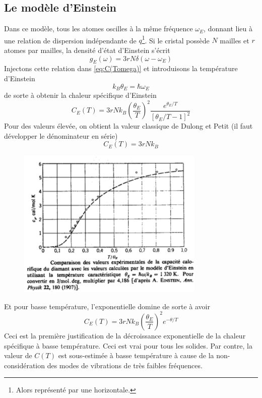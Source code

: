 	\subsection{Le modèle d'Einstein}
	Dans ce modèle, tous les atomes oscilles à la même fréquence $\omega_E$, 
	donnant lieu à une relation de dispersion indépendante de $q$\footnote{
	Alors représenté par une horizontale.}. Si le cristal possède $N$ mailles 
	et $r$ atomes par mailles, la densité d'état d'Einstein s'écrit
	\begin{equation}
	g_E(\omega) = 3rN\delta(\omega-\omega_E)
	\end{equation}
	Injectons cette relation dans \autoref{eq:C(Tomega)} et introduisons la 
	température d'Einstein 
	\begin{equation}
	k_B\theta_E = \hbar \omega_E
	\end{equation}
	de sorte à obtenir la chaleur spécifique d'Einstein
	\begin{equation}
	C_E(T) = 3rNk_B\left(\dfrac{\theta_E}{T}\right)^2\dfrac{e^{\theta_E/T}}{
	\left[\theta_E/T-1\right]^2}
	\end{equation}
	Pour des valeurs élevée, on obtient la valeur classique de Dulong et Petit
	(il faut développer le dénominateur  en série)
	\begin{equation}
	C_E(T) = 3rNk_B
	\end{equation}
		\begin{figure}
	\vspace{-0.6cm}
	\includegraphics[scale=0.4]{ch7/image2.png}
	\end{figure}
	Et pour basse température, l'exponentielle domine de sorte à avoir
	\begin{equation}
	C_E(T) = 3rNk_B\left(\dfrac{\theta_E}{T}\right)^2e^{-\theta/T}
	\end{equation}
	Ceci est la première justification de la décroissance exponentielle de la 
	chaleur spécifique à basse température. Ceci est vrai  pour tous les solides. 
	Par contre, la valeur de $C(T)$ est sous-estimée à basse température à cause 
	de la non-considération des modes de vibrations de très faibles fréquences.

